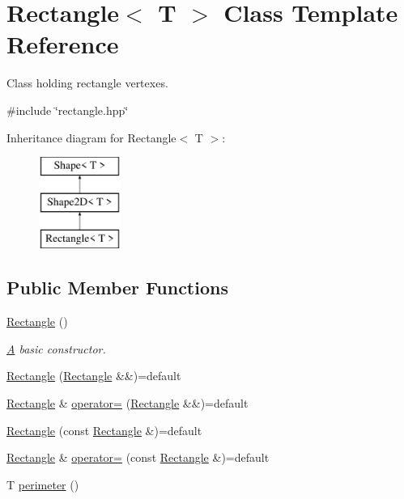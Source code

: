 \hypertarget{classRectangle}{}\section{Rectangle$<$ T $>$ Class Template Reference}
\label{classRectangle}


Class holding rectangle vertexes.  




{\ttfamily \#include \char`\"{}rectangle.\+hpp\char`\"{}}

Inheritance diagram for Rectangle$<$ T $>$\+:\begin{figure}[H]
\begin{center}
\leavevmode
\includegraphics[height=3.000000cm]{classRectangle}
\end{center}
\end{figure}
\subsection*{Public Member Functions}
\begin{DoxyCompactItemize}
\item 
\mbox{\hyperlink{classRectangle_a9d9da3fc8bcb125516cbf2d711d325eb}{Rectangle}} ()
\begin{DoxyCompactList}\small\item\em \mbox{\hyperlink{classA}{A}} basic constructor. \end{DoxyCompactList}\item 
\mbox{\hyperlink{classRectangle_a34cf921863291153b40d9b447f812aa4}{Rectangle}} (\mbox{\hyperlink{classRectangle}{Rectangle}} \&\&)=default
\item 
\mbox{\hyperlink{classRectangle}{Rectangle}} \& \mbox{\hyperlink{classRectangle_ab53b617f14505834f525ec614ccce5c8}{operator=}} (\mbox{\hyperlink{classRectangle}{Rectangle}} \&\&)=default
\item 
\mbox{\hyperlink{classRectangle_acf27dae8f7c9a022428bda816903db2e}{Rectangle}} (const \mbox{\hyperlink{classRectangle}{Rectangle}} \&)=default
\item 
\mbox{\hyperlink{classRectangle}{Rectangle}} \& \mbox{\hyperlink{classRectangle_ad0a038c8959e5bde09bf1e8f49980bea}{operator=}} (const \mbox{\hyperlink{classRectangle}{Rectangle}} \&)=default
\item 
T \mbox{\hyperlink{classRectangle_a9c59dcb7376296711ad86e2da924d3c8}{perimeter}} ()
\end{DoxyCompactItemize}
